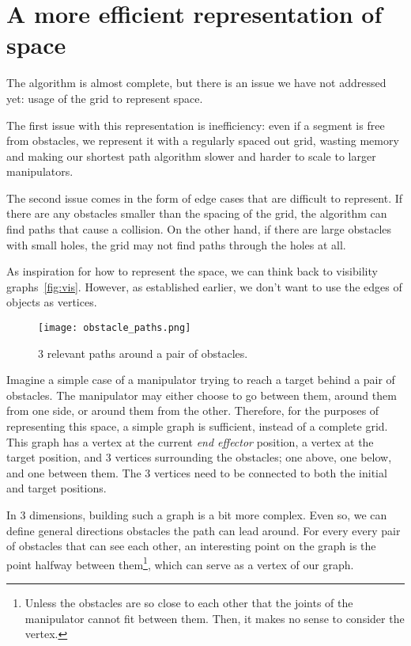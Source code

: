 \clearpage

\section{A more efficient representation of space}

The algorithm is almost complete, but there is an issue we have not addressed yet: usage of the grid to represent space.

The first issue with this representation is inefficiency: even if a segment is free from obstacles, we represent it with a regularly spaced out grid, wasting memory and making our shortest path algorithm slower and harder to scale to larger manipulators.

The second issue comes in the form of edge cases that are difficult to represent. If there are any obstacles smaller than the spacing of the grid, the algorithm can find paths that cause a collision. On the other hand, if there are large obstacles with small holes, the grid may not find paths through the holes at all.

As inspiration for how to represent the space, we can think back to visibility graphs~\ref{fig:vis}. However, as established earlier, we don't want to use the edges of objects as vertices.

\begin{wrapfigure}{r}{0.4\textwidth}
  \centering
  \texttt{[image: obstacle\_paths.png]}
  \caption{3 relevant paths around a pair of obstacles.}
\end{wrapfigure}

Imagine a simple case of a manipulator trying to reach a target behind a pair of obstacles. The manipulator may either choose to go between them, around them from one side, or around them from the other. Therefore, for the purposes of representing this space, a simple graph is sufficient, instead of a complete grid. This graph has a vertex at the current \textit{end effector} position, a vertex at the target position, and 3 vertices surrounding the obstacles; one above, one below, and one between them. The 3 vertices need to be connected to both the initial and target positions.

In 3 dimensions, building such a graph is a bit more complex. Even so, we can define general directions obstacles the path can lead around. For every every pair of obstacles that can see each other, an interesting point on the graph is the point halfway between them\footnote{Unless the obstacles are so close to each other that the joints of the manipulator cannot fit between them. Then, it makes no sense to consider the vertex.}, which can serve as a vertex of our graph.

